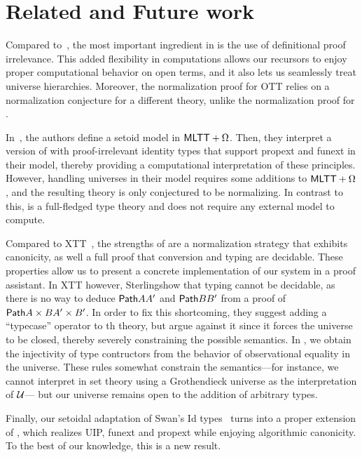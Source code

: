 \section{Related and Future work }
\label{sec:relatedwork}

Compared to~, the most important ingredient in \SetoidTT is the
use of definitional proof irrelevance.
%
This added flexibility in computations allows our recursors to enjoy proper computational
behavior on open terms, and it also lets us seamlessly treat universe hierarchies.
%
Moreover, the normalization proof for OTT relies on a normalization conjecture for a different
theory, unlike the normalization proof for \SetoidTT.

In~, the authors define a setoid model in \( \mathsf{MLTT}+\Omega \). Then, they
interpret a version of \MLTT with proof-irrelevant identity types that support propext and
funext in their model, thereby providing a computational interpretation of these principles.
%
However, handling universes in their model requires some additions to \( \mathsf{MLTT}+\Omega \), and
the resulting theory is only conjectured to be normalizing.
%
In contrast to this, \SetoidTT is a full-fledged type theory and does not require any external
model to compute.

Compared to XTT~, the strengths of \SetoidTT are a
normalization strategy that exhibits canonicity, as well a full proof that conversion and typing
are decidable. These properties allow us to present a concrete implementation of our system
in a proof assistant.
%
In XTT however, Sterling\etal show that typing cannot be decidable, as there is no way to deduce
\( \mathsf{Path}{A}{A'} \) and \( \mathsf{Path}{B}{B'} \) from a proof of \( \mathsf{Path}{A \times B}{A' \times B'} \).
%
In order to fix this shortcoming, they suggest adding a ``typecase'' operator to th theory, but
argue against it since it forces the universe to be closed, thereby severely constraining the
possible semantics.
%
In \SetoidTT, we obtain the injectivity of type contructors from the behavior of observational
equality in the universe. These rules somewhat constrain the semantics---for instance, we cannot
interpret \SetoidTT in set theory using a Grothendieck universe as the interpretation of \( \mathcal{U} \)---
but our universe remains open to the addition of arbitrary types.

Finally, our setoidal adaptation of Swan's Id types~ turns \SetoidTT into a proper
extension of \MLTT, which realizes UIP, funext and propext while enjoying algorithmic canonicity.
To the best of our knowledge, this is a new result.


